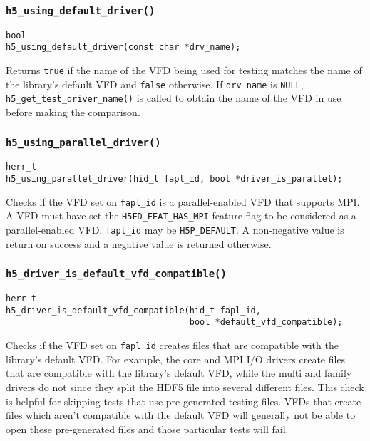 \documentclass[../HDF5_RFC.tex]{subfiles}
\begin{document}
\subsubsection{\texttt{h5\_using\_default\_driver()}}

\begin{verbatim}
bool
h5_using_default_driver(const char *drv_name);
\end{verbatim}

Returns \texttt{true} if the name of the VFD being used for testing matches the name of the
library's default VFD and \texttt{false} otherwise. If \texttt{drv\_name} is \texttt{NULL},
\texttt{h5\_get\_test\_driver\_name()} is called to obtain the name of the VFD in use before
making the comparison.

\subsubsection{\texttt{h5\_using\_parallel\_driver()}}

\begin{verbatim}
herr_t
h5_using_parallel_driver(hid_t fapl_id, bool *driver_is_parallel);
\end{verbatim}

Checks if the VFD set on \texttt{fapl\_id} is a parallel-enabled VFD that supports MPI. A VFD must
have set the \texttt{H5FD\_FEAT\_HAS\_MPI} feature flag to be considered as a parallel-enabled VFD.
\texttt{fapl\_id} may be \texttt{H5P\_DEFAULT}. A non-negative value is return on success and a negative
value is returned otherwise.

\subsubsection{\texttt{h5\_driver\_is\_default\_vfd\_compatible()}}

\begin{verbatim}
herr_t
h5_driver_is_default_vfd_compatible(hid_t fapl_id,
                                    bool *default_vfd_compatible);
\end{verbatim}

Checks if the VFD set on \texttt{fapl\_id} creates files that are compatible with the library's
default VFD. For example, the core and MPI I/O drivers create files that are compatible with the
library's default VFD, while the multi and family drivers do not since they split the HDF5 file
into several different files. This check is helpful for skipping tests that use pre-generated testing
files. VFDs that create files which aren't compatible with the default VFD will generally not be able
to open these pre-generated files and those particular tests will fail.
\end{document}

